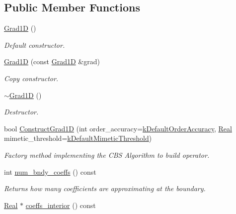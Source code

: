 \subsection*{Public Member Functions}
\begin{DoxyCompactItemize}
\item 
\hyperlink{classmtk_1_1Grad1D_ae21e6ac2652e653c48f15b304ee83a75}{Grad1\-D} ()
\begin{DoxyCompactList}\small\item\em Default constructor. \end{DoxyCompactList}\item 
\hyperlink{classmtk_1_1Grad1D_a5708bcb61bde3f7f3a4ddede191d82a4}{Grad1\-D} (const \hyperlink{classmtk_1_1Grad1D}{Grad1\-D} \&grad)
\begin{DoxyCompactList}\small\item\em Copy constructor. \end{DoxyCompactList}\item 
\hyperlink{classmtk_1_1Grad1D_a2f9b1d306c0f09f36145bb1e7e486b54}{$\sim$\-Grad1\-D} ()
\begin{DoxyCompactList}\small\item\em Destructor. \end{DoxyCompactList}\item 
bool \hyperlink{classmtk_1_1Grad1D_a74ef5245cfae6fd158bd7f563a0c2e52}{Construct\-Grad1\-D} (int order\-\_\-accuracy=\hyperlink{group__c01-roots_ga0d95560098eb36420511103637b6952f}{k\-Default\-Order\-Accuracy}, \hyperlink{group__c01-roots_gac080bbbf5cbb5502c9f00405f894857d}{Real} mimetic\-\_\-threshold=\hyperlink{group__c01-roots_ga35718d949bdc81a08a9cc8ebbe3478a2}{k\-Default\-Mimetic\-Threshold})
\begin{DoxyCompactList}\small\item\em Factory method implementing the C\-B\-S Algorithm to build operator. \end{DoxyCompactList}\item 
int \hyperlink{classmtk_1_1Grad1D_a7168205c21ba00012558f8bba069c119}{num\-\_\-bndy\-\_\-coeffs} () const 
\begin{DoxyCompactList}\small\item\em Returns how many coefficients are approximating at the boundary. \end{DoxyCompactList}\item 
\hyperlink{group__c01-roots_gac080bbbf5cbb5502c9f00405f894857d}{Real} $\ast$ \hyperlink{classmtk_1_1Grad1D_a88735f8d2a6ed986370dc3caeb84959b}{coeffs\-\_\-interior} () const 

\end{DoxyCompactItemize}

